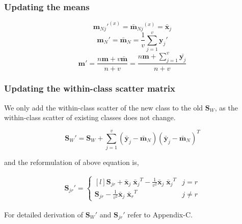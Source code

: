 \subsubsection{Updating the means}
\label{ssubs:MvIDA_SeqNC_mu}
\begin{equation}
\label{eqn:2muij}
{\textbf{m}_{Nj}'}^{(x)} = {\bar{\textbf{m}}_{Nj}}^{(x)} = \bar{\textbf{x}}_{j}
\end{equation}
\begin{equation}
\label{eqn:2mui}
\textbf{m}_{N}' = \bar{\textbf{m}}_{N} = \frac{1}{v} \sum_{j=1}^{v} \textbf{y}_{j}'
\end{equation}
\begin{equation}
\label{eqn:2mu}
\textbf{m}' = \frac{n\textbf{m} + v \bar{\textbf{m}}}{n+v} = \frac{n\textbf{m} + \sum_{j=1}^{v} \bar{\textbf{y}_{j}}}{n+v}
\end{equation}



\subsubsection{Updating the within-class scatter matrix}
\label{ssubs:MvIDA_SeqNC_Sw}
We only add the within-class scatter of the new class to the old $\textbf{S}_W$, as the within-class scatter of existing classes does not change.

\begin{equation}
\label{eqn:2Sw}
\textbf{S}_W' = \textbf{S}_W+\sum_{j=1}^{v}(\bar{\textbf{y}}_j - \bar{\textbf{m}}_{N})(\bar{\textbf{y}}_j - \bar{\textbf{m}}_{N})^T
\end{equation}

\noindent
and the reformulation of above equation is, 

\begin{equation}
\label{eqn:2Sjr}
\begin{split}
\textbf{S}_{jr}' = \left\{\begin{matrix*}[l]
\textbf{S}_{jr} + \bar{\textbf{x}}_{j} \; {\bar{\textbf{x}}_{j}}^T - \frac{1}{v^2} \bar{\textbf{x}}_j \; {\bar{\textbf{x}}_j}^T & j=r \\[0.3cm]
\textbf{S}_{jr} - \frac{1}{v^2} \bar{\textbf{x}}_j \; {\bar{\textbf{x}}_r}^T & j \neq r
\end{matrix*}\right.
\end{split}
\end{equation}

\noindent
For detailed derivation of $\textbf{S}_{W}'$ and $\textbf{S}_{jr}'$ refer to Appendix-C.%



